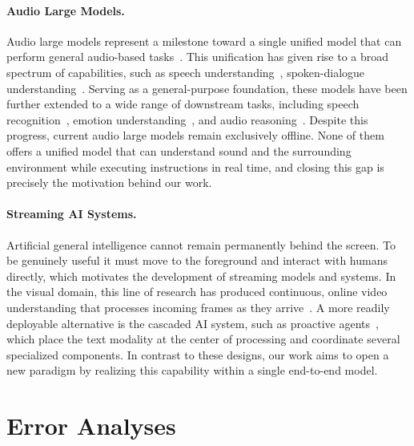 \documentclass{llmxive}
\begin{document}
\paragraph{Audio Large Models.}
Audio large models represent a milestone toward a single unified model
that can perform general audio-based
tasks~\citep{chu2024qwen2, qwen25omni2025, diffa2, stepaudio2}. This
unification has given rise to a broad spectrum of capabilities, such
as speech understanding~\citep{sakshi2024mmau}, spoken-dialogue
understanding~\citep{mmsu}. Serving
as a general-purpose foundation, these models have been further
extended to a wide range of downstream tasks, including speech
recognition~\citep{xu2025fireredasr, seed-asr, qwen3-asr, megaasr},
emotion understanding~\citep{emotionthinker}, and audio
reasoning~\citep{afcot, thinkwith,
audiocog, audio-reasoner}. Despite this progress, current audio
large models remain exclusively offline. None of them offers a unified
model that can understand sound and the surrounding environment while
executing instructions in real time, and closing this gap is precisely
the motivation behind our work.

\paragraph{Streaming AI Systems.}
Artificial general intelligence cannot remain permanently behind the
screen. To be genuinely useful it must move to the foreground and
interact with humans directly, which motivates the development of
streaming models and systems. In the visual domain, this line of
research has produced continuous, online video understanding that
processes incoming frames as they arrive~\citep{chen2024videollm,
li2025videochat}. A more readily deployable alternative is the cascaded AI
system, such as proactive agents~\citep{proactive, proagent,
pask,needllm}, which place the text modality at the center of processing and
coordinate several specialized components. In contrast to these
designs, our work aims to open a new paradigm by realizing this
capability within a single end-to-end model.




\section{Error Analyses}
\label{app:analysis}
\end{document}
